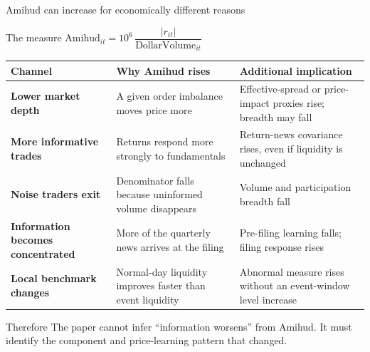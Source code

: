 \documentclass[aspectratio=169,10pt]{beamer}
\begin{document}
\begin{frame}[t,shrink=3]{Amihud can increase for economically different reasons}
\begin{block}{The measure}
\centering
\Large $\text{Amihud}_{it}=10^{6}\,\dfrac{|r_{it}|}{\text{DollarVolume}_{it}}$
\end{block}

\scriptsize
\renewcommand{\arraystretch}{1.14}
\setlength{\tabcolsep}{0.10cm}
\begin{tabularx}{\textwidth}{>{\bfseries\RaggedRight\arraybackslash}p{2.50cm} >{\RaggedRight\arraybackslash}X >{\RaggedRight\arraybackslash}X}
\toprule
Channel & Why Amihud rises & Additional implication \\
\midrule
Lower market depth & A given order imbalance moves price more & Effective-spread or price-impact proxies rise; breadth may fall \\
More informative trades & Returns respond more strongly to fundamentals & Return-news covariance rises, even if liquidity is unchanged \\
Noise traders exit & Denominator falls because uninformed volume disappears & Volume and participation breadth fall \\
Information becomes concentrated & More of the quarterly news arrives at the filing & Pre-filing learning falls; filing response rises \\
Local benchmark changes & Normal-day liquidity improves faster than event liquidity & Abnormal measure rises without an event-window level increase \\
\bottomrule
\end{tabularx}

\begin{alertblock}{Therefore}
\footnotesize The paper cannot infer ``information worsens'' from Amihud. It must identify the component and price-learning pattern that changed.
\end{alertblock}
\end{frame}
\end{document}
